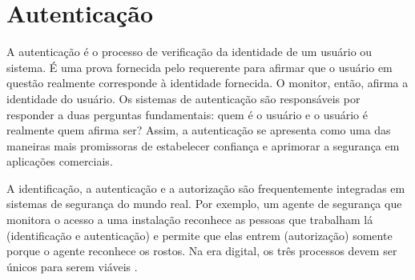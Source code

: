 \section{Autenticação}
\label{sec:autenticacao}


A autenticação é o processo de verificação da identidade de um usuário ou
sistema.
É uma prova fornecida pelo requerente para afirmar que o usuário em questão
realmente corresponde à identidade fornecida.
O monitor, então, afirma a identidade do usuário.
Os sistemas de autenticação são responsáveis por responder a duas perguntas
fundamentais:
quem é o usuário e o usuário é realmente quem afirma ser?
Assim, a autenticação se apresenta como uma das maneiras mais promissoras de
estabelecer confiança e aprimorar a segurança em aplicações comerciais\cite{
    idrus2013}.

A identificação, a autenticação e a autorização são frequentemente integradas em
sistemas de segurança do mundo real.
Por exemplo, um agente de segurança que monitora o acesso a uma instalação
reconhece as pessoas que trabalham lá (identificação e autenticação) e permite
que elas entrem (autorização) somente porque o agente reconhece os rostos.
Na era digital, os três processos devem ser únicos para serem viáveis
\cite[p.97]{renaud2004}.

